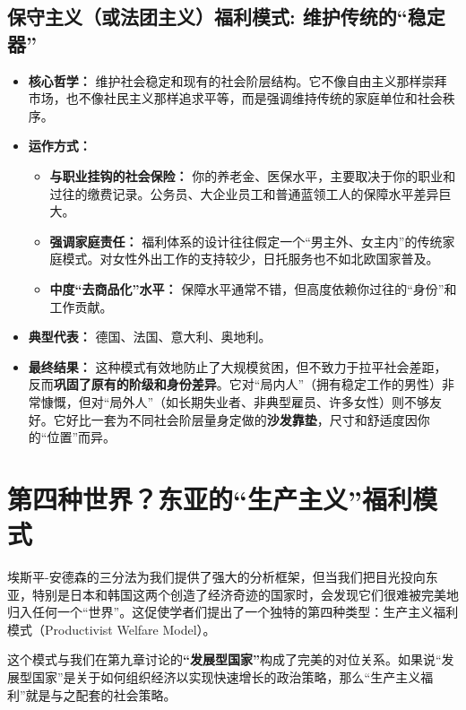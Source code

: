 \documentclass[a5paper, 11pt, openany]{ctexbook}
\begin{document}
\subsection{保守主义（或法团主义）福利模式: 维护传统的“稳定器”}
\begin{itemize}
    \item \textbf{核心哲学：} 维护社会稳定和现有的社会阶层结构。它不像自由主义那样崇拜市场，也不像社民主义那样追求平等，而是强调维持传统的家庭单位和社会秩序。
    \item \textbf{运作方式：}
    \begin{itemize}
        \item \textbf{与职业挂钩的社会保险：} 你的养老金、医保水平，主要取决于你的职业和过往的缴费记录。公务员、大企业员工和普通蓝领工人的保障水平差异巨大。
        \item \textbf{强调家庭责任：} 福利体系的设计往往假定一个“男主外、女主内”的传统家庭模式。对女性外出工作的支持较少，日托服务也不如北欧国家普及。
        \item \textbf{中度“去商品化”水平：} 保障水平通常不错，但高度依赖你过往的“身份”和工作贡献。
    \end{itemize}
    \item \textbf{典型代表：} 德国、法国、意大利、奥地利。
    \item \textbf{最终结果：} 这种模式有效地防止了大规模贫困，但不致力于拉平社会差距，反而\textbf{巩固了原有的阶级和身份差异}。它对“局内人”（拥有稳定工作的男性）非常慷慨，但对“局外人”（如长期失业者、非典型雇员、许多女性）则不够友好。它好比一套为不同社会阶层量身定做的\textbf{沙发靠垫}，尺寸和舒适度因你的“位置”而异。
\end{itemize}

\section{第四种世界？东亚的“生产主义”福利模式}

埃斯平-安德森的三分法为我们提供了强大的分析框架，但当我们把目光投向东亚，特别是日本和韩国这两个创造了经济奇迹的国家时，会发现它们很难被完美地归入任何一个“世界”。这促使学者们提出了一个独特的第四种类型：生产主义福利模式（Productivist Welfare Model）。

这个模式与我们在第九章讨论的\textbf{“发展型国家”}构成了完美的对位关系。如果说“发展型国家”是关于如何组织经济以实现快速增长的政治策略，那么“生产主义福利”就是与之配套的社会策略。
\end{document}
